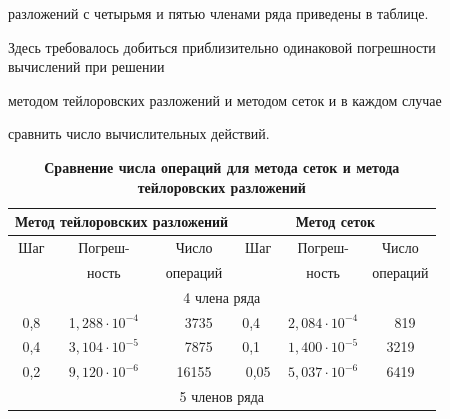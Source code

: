 разложений с четырьмя и пятью членами ряда приведены в таблице. 

Здесь требовалось добиться приблизительно одинаковой погрешности вычислений при решении

методом тейлоровских разложений и методом сеток и в каждом случае

сравнить число вычислительных действий.



\begin{table}[h!] \centering \small

\caption*{\bf Сравнение числа операций для метода сеток и метода  тейлоровских разложений} \vspace{-3mm}

\begin{tabular}{c|c|c|c|c|c} 

\hline

\multicolumn{3}{c|}{\footnotesize Метод тейлоровских разложений} &

\multicolumn{3}{c}{\footnotesize  Метод сеток}  \\ 

\hline 

\footnotesize Шаг & \footnotesize Погреш- & \footnotesize Число & \footnotesize  Шаг&

\footnotesize  Погреш- & \footnotesize Число \\ 

& \footnotesize ность & \footnotesize операций & & \footnotesize ность  & \footnotesize операций \\ 

\hline

\multicolumn{6}{c}{\rule{0mm}{12pt}\footnotesize 4 члена ряда} \\

\hline

\rule{0mm}{12pt}%

0,8& 1$,288 \cdot 10^{-4}$ & ~\,3735 & 0,4~~ & $2,084 \cdot 10^{-4}$& ~\,819 \\ 

0,4& $3,104 \cdot 10^{-5}$& ~\,7875&0,1~~ & $1,400\cdot 10^{-5}$ &3219 \\ 

0,2& $9,120 \cdot 10^{-6}$ &16155&0,05& $5,037 \cdot 10^{-6}$ & 6419 \\ 

\hline

\multicolumn{6}{c}{\rule{0mm}{12pt}\footnotesize 5 членов ряда} \\


\end{tabular}
\end{table}
